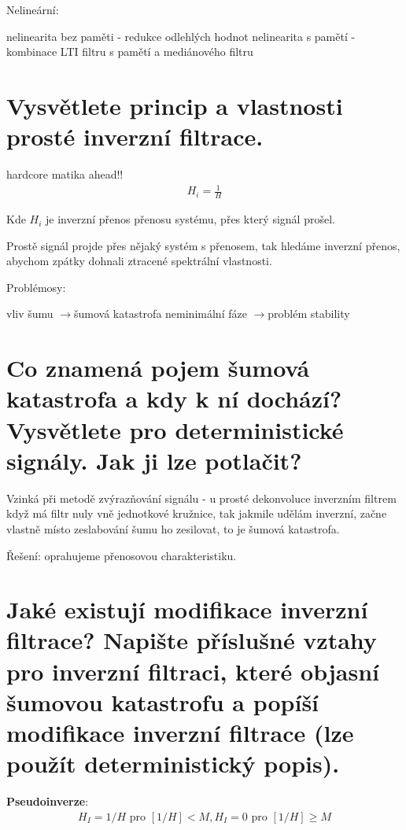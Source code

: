 \documentclass[a4paper,12pt]{article}   %
\newcommand{\rrarr}{$\rightarrow$}
\newcommand{\mt}[1]{$#1$}
\begin{document}
Nelineární:
\begin{outline}
        \1 nelinearita bez paměti - redukce odlehlých hodnot
        \1 nelinearita s pamětí - kombinace LTI filtru s pamětí a mediánového filtru
\end{outline}


\section{Vysvětlete princip a vlastnosti prosté inverzní filtrace.}

hardcore matika ahead!!
\begin{align*}
        H_i = \frac{1}{H}
\end{align*}

Kde \mt{H_i} je inverzní přenos přenosu systému, přes který signál prošel.

Prostě signál projde přes nějaký systém s přenosem, tak hledáme inverzní přenos, abychom zpátky dohnali ztracené spektrální vlastnosti. 

Problémosy:
\begin{outline}
        \1 vliv šumu \rrarr šumová katastrofa
        \1 neminimální fáze \rrarr problém stability
\end{outline}



\section{Co znamená pojem šumová katastrofa a kdy k ní dochází? Vysvětlete pro deterministické signály. Jak ji lze potlačit?}

Vzinká při metodě zvýrazňování signálu - u prosté dekonvoluce inverzním filtrem
když má filtr nuly vně jednotkové kružnice, tak jakmile udělám inverzní, začne vlastně místo zeslabování šumu ho zesilovat, to je šumová katastrofa.

Řešení: oprahujeme přenosovou charakteristiku.


\section{Jaké existují modifikace inverzní filtrace? Napište příslušné vztahy pro inverzní filtraci, které objasní šumovou katastrofu a popíší modifikace inverzní filtrace (lze použít deterministický popis).}
\textbf{Pseudoinverze}:
\begin{align*}
        H_I = 1/H \text{ pro } [1/H] < M, H_I = 0 \text{ pro } [1/H] \geq M 
\end{align*}
\end{document}
